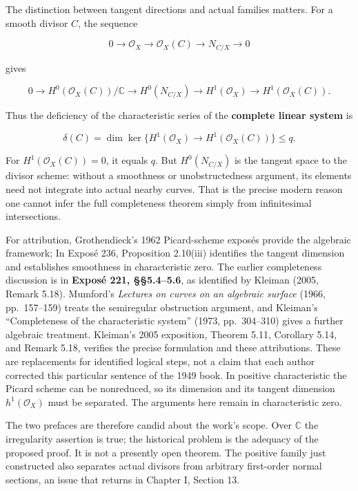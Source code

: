 The distinction between tangent directions and actual families matters. For a smooth divisor \(C\), the sequence

\[
0\longrightarrow\mathcal O_X\longrightarrow\mathcal O_X(C)
\longrightarrow N_{C/X}\longrightarrow0
\]

gives

\[
0\longrightarrow H^0(\mathcal O_X(C))/\mathbb C
\longrightarrow H^0(N_{C/X})
\longrightarrow H^1(\mathcal O_X)
\longrightarrow H^1(\mathcal O_X(C)).
\]

Thus the deficiency of the characteristic series of the \textbf{complete linear system} is

\[
\delta(C)=\dim\ker\{H^1(\mathcal O_X)\longrightarrow H^1(\mathcal O_X(C))\}\le q.
\]

For \(H^1(\mathcal O_X(C))=0\), it equals \(q\). But \(H^0(N_{C/X})\) is the tangent space to the divisor scheme: without a smoothness or unobstructedness argument, its elements need not integrate into actual nearby curves. That is the precise modern reason one cannot infer the full completeness theorem simply from infinitesimal intersections.

For attribution, Grothendieck's 1962 Picard-scheme exposés provide the algebraic framework; In Exposé 236, Proposition 2.10(iii) identifies the tangent dimension and establishes smoothness in characteristic zero. The earlier completeness discussion is in \textbf{Exposé 221, §§5.4--5.6}, as identified by Kleiman (2005, Remark 5.18). Mumford's \emph{Lectures on curves on an algebraic surface} (1966, pp.~157--159) treats the semiregular obstruction argument, and Kleiman's ``Completeness of the characteristic system'' (1973, pp.~304--310) gives a further algebraic treatment. Kleiman's 2005 exposition, Theorem 5.11, Corollary 5.14, and Remark 5.18, verifies the precise formulation and these attributions. These are replacements for identified logical steps, not a claim that each author corrected this particular sentence of the 1949 book. In positive characteristic the Picard scheme can be nonreduced, so its dimension and its tangent dimension \(h^1(\mathcal O_X)\) must be separated. The arguments here remain in characteristic zero.

The two prefaces are therefore candid about the work's scope. Over \(\mathbb C\) the irregularity assertion is true; the historical problem is the adequacy of the proposed proof. It is not a presently open theorem. The positive family just constructed also separates actual divisors from arbitrary first-order normal sections, an issue that returns in Chapter I, Section 13.

